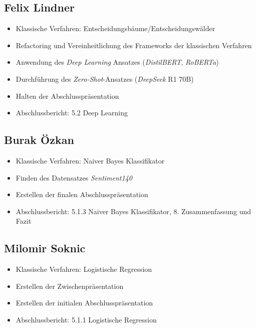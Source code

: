 \begin{multicols}{2}
\subsection{Felix Lindner}
\begin{itemize}
    \item Klassische Verfahren: Entscheidungsbäume/Entscheidungswälder
    \item Refactoring und Vereinheitlichung des Frameworks der klassischen Verfahren
    \item Anwendung des \textit{Deep Learning} Ansatzes (\textit{DistilBERT}, \textit{RoBERTa})
    \item Durchführung des \textit{Zero-Shot}-Ansatzes (\textit{DeepSeek} R1 70B)
    \item Halten der Abschlusspräsentation
    \item Abschlussbericht: 5.2 Deep Learning
\end{itemize}

\subsection{Burak Özkan}
\begin{itemize}
    \item Klassische Verfahren: Naiver Bayes Klassifikator
    \item Finden des Datensatzes \textit{Sentiment140}
    \item Erstellen der finalen Abschlusspräsentation
    \item Abschlussbericht: 5.1.3 Naiver Bayes Klassifikator, 8. Zusammenfassung und Fazit
\end{itemize}

\subsection{Milomir Soknic}
\begin{itemize}
    \item Klassische Verfahren: Logistische Regression
    \item Erstellen der Zwischenpräsentation
    \item Erstellen der initialen Abschlusspräsentation
    \item Abschlussbericht: 5.1.1 Logistische Regression
\end{itemize}

\end{multicols}
